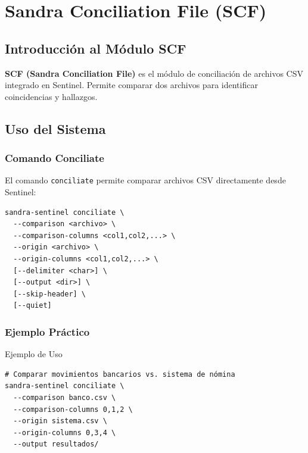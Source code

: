 \chapter{Sandra Conciliation File (SCF)}

\section{Introducción al Módulo SCF}

\textbf{SCF (Sandra Conciliation File)} es el módulo de conciliación de archivos CSV integrado en Sentinel. Permite comparar dos archivos para identificar coincidencias y hallazgos.


\section{Uso del Sistema}

\subsection{Comando Conciliate}

El comando \texttt{conciliate} permite comparar archivos CSV directamente desde Sentinel:

\begin{verbatim}
sandra-sentinel conciliate \
  --comparison <archivo> \
  --comparison-columns <col1,col2,...> \
  --origin <archivo> \
  --origin-columns <col1,col2,...> \
  [--delimiter <char>] \
  [--output <dir>] \
  [--skip-header] \
  [--quiet]
\end{verbatim}


\subsection{Ejemplo Práctico}

\begin{caja}{Ejemplo de Uso}
\begin{verbatim}
# Comparar movimientos bancarios vs. sistema de nómina
sandra-sentinel conciliate \
  --comparison banco.csv \
  --comparison-columns 0,1,2 \
  --origin sistema.csv \
  --origin-columns 0,3,4 \
  --output resultados/
\end{verbatim}
\end{caja}

